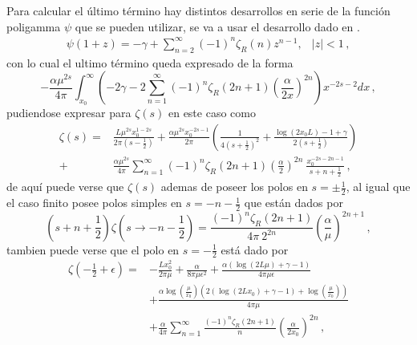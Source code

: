 Para calcular el último término hay distintos desarrollos en serie de la función poligamma $\psi $ que se pueden utilizar, se va a usar el desarrollo dado en \cite{Abramowitz:1974:HMF:1098650}.
\begin{equation}
\begin{array}{cc}
\psi (1+ z ) = - \gamma + \sum \limits_{n=2}^{\infty} (-1) ^n \zeta _R (n) z ^{n-1},  & |z| < 1
\, ,
\end{array}
\label{repr}
\end{equation}
con lo cual el ultimo término queda expresado de la forma
\begin{equation}
- \frac{\alpha \mu ^{2s}}{4 \pi}
\int _{x_0} ^{\infty}
\left(
-2 \gamma -
2 \sum _{n=1} ^{\infty} 
(-1) ^{n}
\zeta _R (2n+1) 
\left( \frac{\alpha}{2 x} \right) ^{2n}
\right)
x ^{-2s-2} dx
\, ,
\end{equation}
pudiendose expresar para $\zeta  (s) $ en este caso como
\begin{align}
	\zeta (s)=
&
\nonumber
	\frac{L  \mu ^{2s} x _0 ^{1-2s} }{2 \pi \left( s- \frac{1}{2} \right)}  + 
	\frac{\alpha \mu ^{2s} x _{0} ^{-2s-1} }{2 \pi} 
	\left( 
	\frac{1}{4 \left(s+ \frac{1}{2} \right) ^2} +
	\frac{\log(2 x _0 L) -1 + \gamma}{2 \left(s+\frac{1}{2} \right)} 
	\right) 
\\
+
&	
	\frac{\alpha \mu ^{2s}}{4\pi} 
	\sum _{n=1} ^{\infty} (-1) ^{n} \zeta _R (2n+1) 
	\left( \frac{\alpha}{2 } \right) ^{2n} \ \frac{x _0 ^{-2s-2n-1}}{s+n+ \frac{1}{2}}
	\, ,
\end{align}
de aquí puede verse que $ \zeta (s) $ ademas de poseer los polos en $s = \pm \frac{1}{2}$, al igual que el caso finito posee polos simples en $ s = -n - \frac{1}{2}$ que están dados por
\begin{equation}
	\left( s + n + \frac{1}{2}\right)
	\zeta \left( s \rightarrow -n - \frac{1}{2}\right) =
	\frac{(-1) ^n \zeta _R (2n+1)}{4 \pi \ 2 ^{ 2n } }
	\left( \frac{\alpha}{\mu} \right) ^{2n+1}
	\, ,
\end{equation}
tambien puede verse que el polo en $s = - \frac{1}{2}$ está dado por 
\begin{align}
	\zeta \left(- \frac{1}{2} + \epsilon \right)=
&
\nonumber
	-
	\frac{L x _0 ^2}{2 \pi \mu}+ 
	\frac{\alpha}{8 \pi \mu  \epsilon  ^2} +
	\frac{\alpha \left( \log (2 L \mu ) + \gamma -1  \right)}{4 \pi \mu  \epsilon }
\\
\nonumber
&
+
	\frac{\alpha \log \left( \frac{\mu}{x _0} \right) 	
		\left( 2 (\log ( 2 L x_0) + \gamma -1 ) + \log \left( \frac{\mu}{x _0}\right)  \right) }{4 \pi \mu}
\\
&
+	
	\frac{\alpha }{4\pi} 
	\sum _{n=1} ^{\infty} \frac{(-1) ^{n} \zeta _R (2n+1) }{n}  
	\left( \frac{\alpha}{2 x _0} \right) ^{2n}
\, ,
\end{align}
